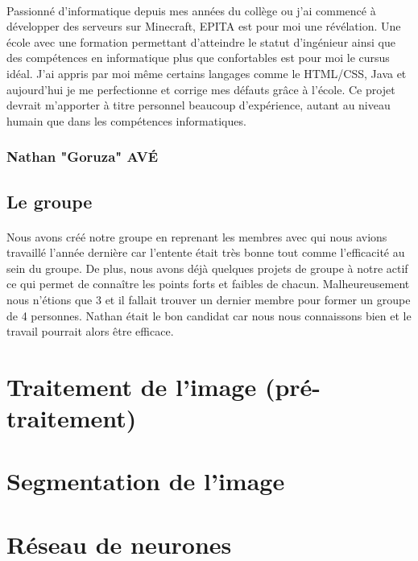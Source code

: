 \documentclass{article}
\begin{document}
\paragraph{}Passionné d'informatique depuis mes années du collège ou j'ai commencé à développer des serveurs sur Minecraft, EPITA est pour moi une révélation. Une école avec une formation permettant d'atteindre le statut d'ingénieur ainsi que des compétences en informatique plus que confortables est pour moi le cursus idéal. J'ai appris par moi même certains langages comme le HTML/CSS, Java et aujourd'hui je me perfectionne et corrige mes défauts grâce à l'école. Ce projet devrait m'apporter à titre personnel beaucoup d'expérience, autant au niveau humain que dans les compétences informatiques.

\subsubsection{Nathan "Goruza" AVÉ}


\newpage


\subsection{Le groupe}

\paragraph{}Nous avons créé notre groupe en reprenant les membres avec qui nous avions travaillé l'année dernière car l'entente était très bonne tout comme l'efficacité au sein du groupe. De plus, nous avons déjà quelques projets de groupe à notre actif ce qui permet de connaître les points forts et faibles de chacun. Malheureusement nous n'étions que 3 et il fallait trouver un dernier membre pour former un groupe de 4 personnes. Nathan était le bon candidat car nous nous connaissons bien et le travail pourrait alors être efficace.
\paragraph{}

\newpage

\section{Traitement de l'image (pré-traitement)}

\section{Segmentation de l'image}

\section{Réseau de neurones}
\end{document}
